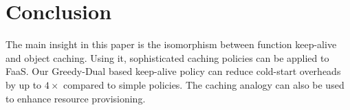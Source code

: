 \section{Conclusion}

The main insight in this paper is the isomorphism between function keep-alive and object caching.
Using it, sophisticated caching policies can be applied to FaaS.
Our Greedy-Dual based keep-alive policy can reduce cold-start overheads by up to $4\times$ compared to simple policies.
The caching analogy can also be used to enhance resource provisioning. 
